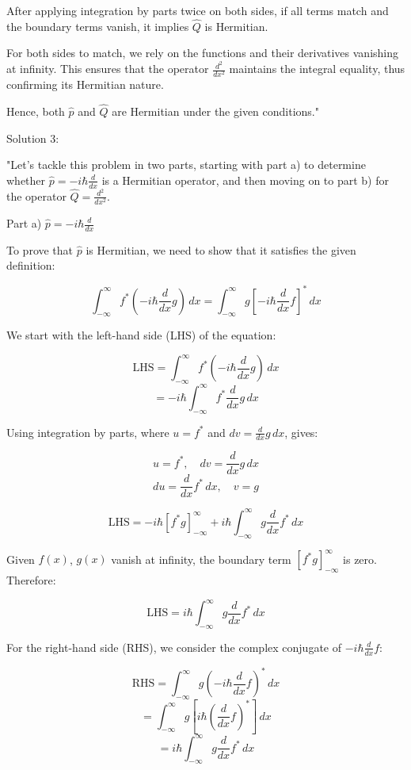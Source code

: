 After applying integration by parts twice on both sides, if all terms match and the boundary terms vanish, it implies \( \hat{Q} \) is Hermitian.

For both sides to match, we rely on the functions and their derivatives vanishing at infinity. This ensures that the operator \( \frac{d^{2}}{dx^{2}} \) maintains the integral equality, thus confirming its Hermitian nature.

Hence, both \( \hat{p} \) and \( \hat{Q} \) are Hermitian under the given conditions."

Solution 3:

"Let's tackle this problem in two parts, starting with part a) to determine whether \( \hat{p} = -i\hbar\frac{d}{dx} \) is a Hermitian operator, and then moving on to part b) for the operator \( \hat{Q} = \frac{d^{2}}{dx^{2}} \).

Part a) \( \hat{p} = -i\hbar\frac{d}{dx} \)

To prove that \( \hat{p} \) is Hermitian, we need to show that it satisfies the given definition:

\[ \int_{-\infty}^{\infty} f^{*}(-i\hbar\frac{d}{dx}g) \, dx = \int_{-\infty}^{\infty} g[-i\hbar\frac{d}{dx}f]^{*} \, dx \]

We start with the left-hand side (LHS) of the equation:

\[ \text{LHS} = \int_{-\infty}^{\infty} f^{*}(-i\hbar\frac{d}{dx}g) \, dx \]
\[ = -i\hbar\int_{-\infty}^{\infty} f^{*}\frac{d}{dx}g \, dx \]

Using integration by parts, where \( u = f^{*} \) and \( dv = \frac{d}{dx}g \, dx \), gives:

\[ u = f^{*}, \quad dv = \frac{d}{dx}g \, dx \]
\[ du = \frac{d}{dx}f^{*} \, dx, \quad v = g \]

\[ \text{LHS} = -i\hbar[f^{*}g]_{-\infty}^{\infty} + i\hbar\int_{-\infty}^{\infty} g\frac{d}{dx}f^{*} \, dx \]

Given \( f(x) \), \( g(x) \) vanish at infinity, the boundary term \( [f^{*}g]_{-\infty}^{\infty} \) is zero. Therefore:

\[ \text{LHS} = i\hbar\int_{-\infty}^{\infty} g\frac{d}{dx}f^{*} \, dx \]

For the right-hand side (RHS), we consider the complex conjugate of \( -i\hbar\frac{d}{dx}f \):

\[ \text{RHS} = \int_{-\infty}^{\infty} g(-i\hbar\frac{d}{dx}f)^{*} \, dx \]
\[ = \int_{-\infty}^{\infty} g[i\hbar(\frac{d}{dx}f)^{*}] \, dx \]
\[ = i\hbar\int_{-\infty}^{\infty} g\frac{d}{dx}f^{*} \, dx \]

